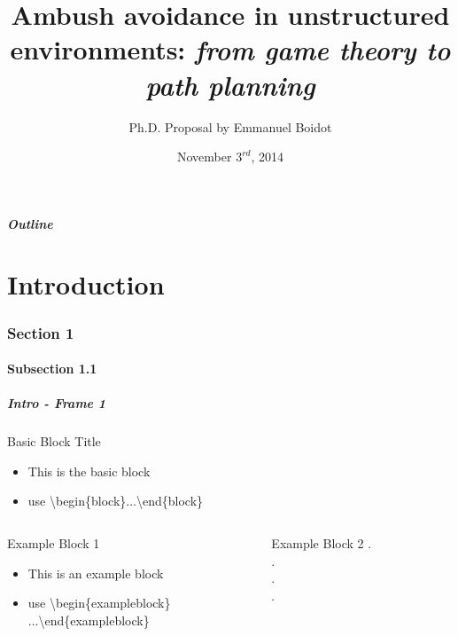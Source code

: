 \documentclass[10pt,compress]{beamer}
\title[Ambush avoidance routing] %
{Ambush avoidance in unstructured environments: \textit{from game theory to path planning}}
\author[E. Boidot]{Ph.D. Proposal by Emmanuel Boidot}
\institute %
{Advisor: Dr. Eric Feron \\ Georgia Institute of Technology\\
  Guggenheim School of Aerospace Engineering}
\date{November $3^{rd}$, 2014} %
\begin{document}
{
\setlength{\headheight}{0in}
\begin{frame}
\titlepage
\end{frame}
}
\addtocounter{framenumber}{-1}

{
\begin{frame}\frametitle{Outline}
  \parttableofcontents
\end{frame} 
}

\part[Intro]{Introduction} 

\section{Section 1}
\subsection{Subsection 1.1}
\begin{frame}\frametitle{Intro - Frame 1} 
\begin{block}{Basic Block Title}
\begin{itemize}
 \item This is the basic block
\item use \textbackslash begin\{block\}...\textbackslash end\{block\}
\end{itemize}
\end{block}
\pause
\begin{columns}
\begin{column}{5cm}
\begin{exampleblock}{Example Block 1}
\begin{itemize}
 \item This is an example block
\item use \textbackslash begin\{exampleblock\}\\ ...\textbackslash end\{exampleblock\}
\end{itemize}
\end{exampleblock}
\pause
\end{column}
\begin{column}{5cm}
\begin{exampleblock}{Example Block 2}
.\\
.\\
.\\
.\\
\end{exampleblock}
\end{column}
\end{columns}
\end{frame}
\end{document}
